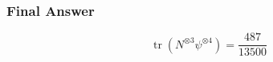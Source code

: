 \subsubsection*{Final Answer}

\[
\boxed{\operatorname{tr}\!\left(N^{\otimes3}\psi^{\otimes4}\right)=\frac{487}{13500}}
\]
